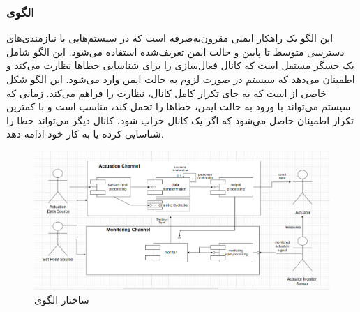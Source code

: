 \subsubsection{الگوی }
\label{archSafeMonActSec}
\begin{RTL}
این الگو \cite{ref4} یک راهکار ایمنی مقرون‌به‌صرفه است که در سیستم‌هایی
با نیازمندی‌های دسترسی متوسط تا پایین و حالت ایمن تعریف‌شده استفاده می‌شود.
این الگو شامل یک حسگر مستقل است که کانال فعال‌سازی
را برای شناسایی خطاها نظارت می‌کند و اطمینان می‌دهد که
سیستم در صورت لزوم به حالت ایمن وارد می‌شود. این الگو شکل
خاصی از  است که به جای تکرار
کامل کانال، نظارت را فراهم می‌کند. زمانی که سیستم می‌تواند با ورود
به حالت ایمن، خطاها را تحمل کند، مناسب است و
با کمترین تکرار اطمینان حاصل می‌شود که اگر یک کانال خراب شود،
کانال دیگر می‌تواند خطا را شناسایی کرده یا به کار خود ادامه دهد.
\end{RTL}
\begin{figure}[h!]
\centering
\includegraphics[scale=0.5]{images/third/monitorActuator.png}
\caption{ساختار الگوی }
\end{figure}